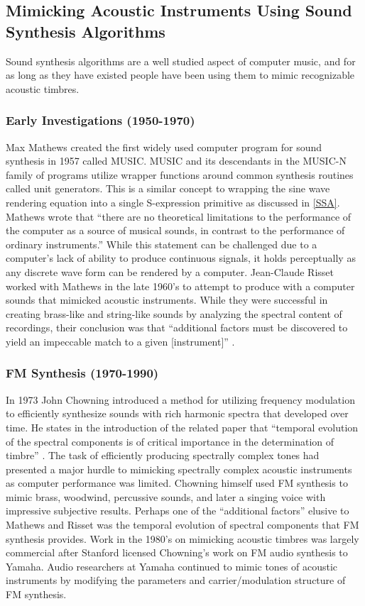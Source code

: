 \documentclass[12pt]{article}
\begin{document}
\subsection{Mimicking Acoustic Instruments Using Sound Synthesis Algorithms}
Sound synthesis algorithms are a well studied aspect of computer music, and for as long as they have existed people have been using them to mimic recognizable acoustic timbres.

\subsubsection{Early Investigations (1950-1970)}
Max Mathews created the first widely used computer program for sound synthesis in 1957 called MUSIC. MUSIC and its descendants in the MUSIC-N family of programs utilize wrapper functions around common synthesis routines called unit generators. This is a similar concept to wrapping the sine wave rendering equation into a single S-expression primitive as discussed in \ref{SSA}. Mathews wrote that ``there are no theoretical limitations to the performance of the computer as a source of musical sounds, in contrast to the performance of ordinary instruments.'' \citep{mathews01111963} While this statement can be challenged due to a computer's lack of ability to produce continuous signals, it holds perceptually as any discrete wave form can be rendered by a computer. Jean-Claude Risset worked with Mathews in the late 1960's to attempt to produce with a computer sounds that mimicked acoustic instruments. While they were successful in creating brass-like and string-like sounds by analyzing the spectral content of recordings, their conclusion was that ``additional factors must be discovered to yield an impeccable match to a given [instrument]'' \citep{risset1969analysis}.

\subsubsection{FM Synthesis (1970-1990)}
In 1973 John Chowning introduced a method for utilizing frequency modulation to efficiently synthesize sounds with rich harmonic spectra that developed over time. He states in the introduction of the related paper that ``temporal evolution of the spectral components is of critical importance in the determination of timbre'' \citep{chowning1973synthesis}. The task of efficiently producing spectrally complex tones had presented a major hurdle to mimicking spectrally complex acoustic instruments as computer performance was limited. Chowning himself used FM synthesis to mimic brass, woodwind, percussive sounds, and later a singing voice \citep{chowning1989frequency} with impressive subjective results. Perhaps one of the ``additional factors'' elusive to Mathews and Risset was the temporal evolution of spectral components that FM synthesis provides.
Work in the 1980's on mimicking acoustic timbres was largely commercial after Stanford licensed Chowning's work on FM audio synthesis to Yamaha. Audio researchers at Yamaha continued to mimic tones of acoustic instruments by modifying the parameters and carrier/modulation structure of FM synthesis.
\end{document}
